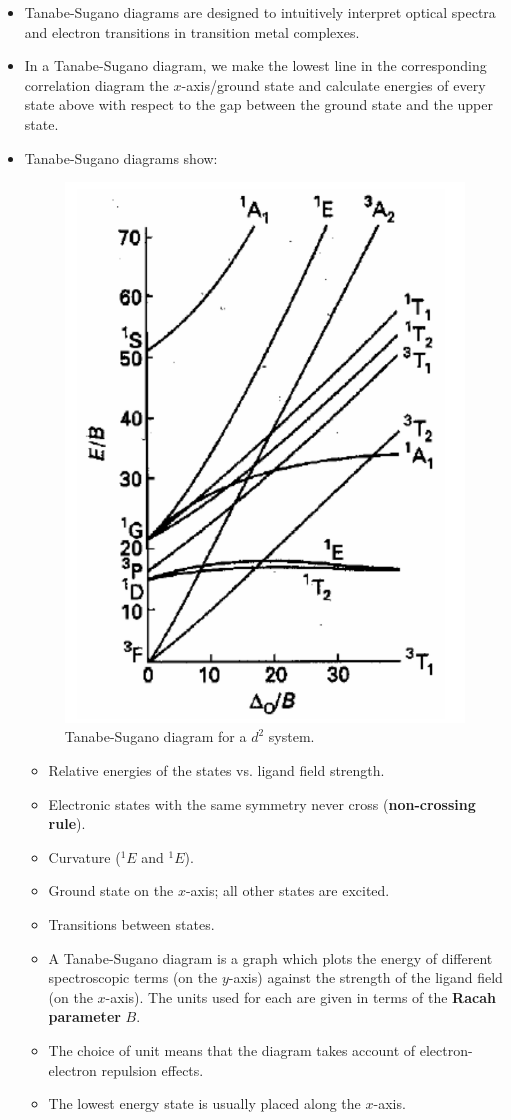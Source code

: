 \documentclass[../notes.tex]{subfiles}
\begin{document}
\begin{itemize}
    \item Tanabe-Sugano diagrams are designed to intuitively interpret optical spectra and electron transitions in transition metal complexes.
    \item In a Tanabe-Sugano diagram, we make the lowest line in the corresponding correlation diagram the $x$-axis/ground state and calculate energies of every state above with respect to the gap between the ground state and the upper state.
    \item Tanabe-Sugano diagrams show:
    \begin{figure}[H]
        \centering
        \includegraphics[width=0.35\linewidth]{../ExtFiles/tanabeSugano-d2.png}
        \caption{Tanabe-Sugano diagram for a $d^2$ system.}
        \label{fig:tanabeSugano-d2}
    \end{figure}
    \begin{itemize}
        \item Relative energies of the states vs. ligand field strength.
        \item Electronic states with the same symmetry never cross (\textbf{non-crossing rule}).
        \item Curvature (${}^1E$ and ${}^1E$).
        \item Ground state on the $x$-axis; all other states are excited.
        \item Transitions between states.
        \item A Tanabe-Sugano diagram is a graph which plots the energy of different spectroscopic terms (on the $y$-axis) against the strength of the ligand field (on the $x$-axis). The units used for each are given in terms of the \textbf{Racah parameter} $B$.
        \item The choice of unit means that the diagram takes account of electron-electron repulsion effects.
        \item The lowest energy state is usually placed along the $x$-axis.

\end{itemize}
\end{itemize}
\end{document}

